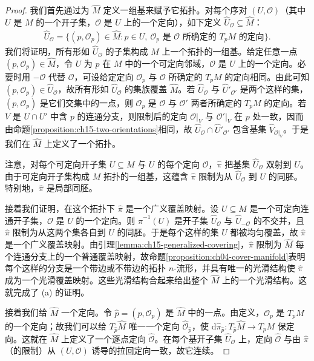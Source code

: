 \documentclass[../../main.tex]{subfiles}
\begin{document}
\begin{proof}
我们首先通过为 $\widehat M$ 定义一组基来赋予它拓扑。对每个序对 $(U,\mathcal O)$（其中 $U$ 是 $M$ 的一个开子集，$\mathcal O$ 是 $U$ 上的一个定向），如下定义 $\widehat U_{\mathcal O}\subseteq\widehat M$：
\begin{align*}
\widehat U_{\mathcal O}=\{(p,\mathcal O_p)\in\widehat M:p\in U,\ \mathcal O_p\text{ 是 }\mathcal O\text{ 所确定的 }T_pM\text{ 的定向}\}.
\end{align*}
我们将证明，所有形如 $\widehat U_{\mathcal O}$ 的子集构成 $\widehat M$ 上一个拓扑的一组基。给定任意一点 $(p,\mathcal O_p)\in\widehat M$，令 $U$ 为 $p$ 在 $M$ 中的一个可定向邻域，$\mathcal O$ 是 $U$ 上的一个定向。必要时用 $-\mathcal O$ 代替 $\mathcal O$，可设给定定向 $\mathcal O_p$ 与 $\mathcal O$ 所确定的 $T_pM$ 的定向相同。由此可知 $(p,\mathcal O_p)\in\widehat U_{\mathcal O}$，故所有形如 $\widehat U_{\mathcal O}$ 的集族覆盖 $\widehat M$。若 $\widehat U_{\mathcal O}$ 与 $\widehat U'_{\mathcal O'}$ 是两个这样的集，$(p,\mathcal O_p)$ 是它们交集中的一点，则 $\mathcal O_p$ 是 $\mathcal O$ 与 $\mathcal O'$ 两者所确定的 $T_pM$ 的定向。若 $V$ 是 $U\cap U'$ 中含 $p$ 的连通分支，则限制后的定向 $\mathcal O|_V$ 与 $\mathcal O'|_V$ 在 $p$ 处一致，因而由命题\ref{proposition:ch15-two-orientations}相同，故 $\widehat U_{\mathcal O}\cap\widehat U'_{\mathcal O'}$ 包含基集 $\widehat V_{\mathcal O|_V}$。于是我们在 $\widehat M$ 上定义了一个拓扑。

注意，对每个可定向开子集 $U\subseteq M$ 与 $U$ 的每个定向 $\mathcal O$，$\widehat\pi$ 把基集 $\widehat U_{\mathcal O}$ 双射到 $U$。由于可定向开子集构成 $M$ 拓扑的一组基，这蕴含 $\widehat\pi$ 限制为从 $\widehat U_{\mathcal O}$ 到 $U$ 的同胚。特别地，$\widehat\pi$ 是局部同胚。

接着我们证明，在这个拓扑下 $\widehat\pi$ 是一个广义覆盖映射。设 $U\subseteq M$ 是一个可定向连通开子集，$\mathcal O$ 是 $U$ 的一个定向。则 $\widehat\pi^{-1}(U)$ 是开子集 $\widehat U_{\mathcal O}$ 与 $\widehat U_{-\mathcal O}$ 的不交并，且 $\widehat\pi$ 限制为从这两个集各自到 $U$ 的同胚。于是每个这样的集 $U$ 都被均匀覆盖，故 $\widehat\pi$ 是一个广义覆盖映射。由引理\ref{lemma:ch15-generalized-covering}，$\widehat\pi$ 限制为 $\widehat M$ 每个连通分支上的一个普通覆盖映射，故命题\ref{proposition:ch04-cover-manifold}表明每个这样的分支是一个带边或不带边的拓扑 $n$-流形，并具有唯一的光滑结构使 $\widehat\pi$ 成为一个光滑覆盖映射。这些光滑结构合起来给出整个 $\widehat M$ 上的一个光滑结构。这就完成了 (a) 的证明。

接着我们给 $\widehat M$ 一个定向。令 $\widehat p=(p,\mathcal O_p)$ 是 $\widehat M$ 中的一点。由定义，$\mathcal O_p$ 是 $T_pM$ 的一个定向；故我们可以给 $T_{\widehat p}\widehat M$ 唯一一个定向 $\widehat{\mathcal O}_{\widehat p}$，使 $\mathrm{d}\widehat\pi_{\widehat p}:T_{\widehat p}\widehat M\to T_pM$ 保定向。这就在 $\widehat M$ 上定义了一个逐点定向 $\widehat{\mathcal O}$。在每个基开子集 $\widehat U_{\mathcal O}$ 上，定向 $\widehat{\mathcal O}$ 与由 $\widehat\pi$（的限制）从 $(U,\mathcal O)$ 诱导的拉回定向一致，故它连续。


\end{proof}
\end{document}
